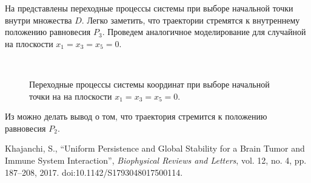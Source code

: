 \documentclass[14pt,a4paper]{extarticle}
\begin{document}
\begin{example}
		На  представлены переходные процессы системы при выборе начальной точки внутри множества $D$. Легко заметить, что траектории стремятся к внутреннему положению равновесия $P_3$. Проведем аналогичное моделирование для случайной на плоскости $x_1=x_3=x_5=0$.
		
		\begin{figure}[h]
			\centering
			\\
			\caption{Переходные процессы системы координат при выборе начальной точки на на плоскости $x_1=x_3=x_5=0$.}
			\label{fig:on_D_border}
		\end{figure}
		
		Из  можно делать вывод о том, что траектория стремится к положению равновесия $P_2$.
		
	\end{example}
	 
	\newpage
	\begin{thebibliography}{1}
		Khajanchi, S., “Uniform Persistence and Global Stability for a Brain Tumor and Immune System Interaction”, \textit{Biophysical Reviews and Letters}, vol. 12, no. 4, pp. 187–208, 2017. doi:10.1142/S1793048017500114.
	\end{thebibliography}
	
\end{document}
